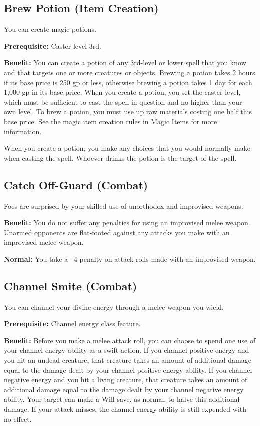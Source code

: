 \subsection{Brew Potion (Item Creation)}

				
You can create magic potions.
				
\textbf{Prerequisite:} Caster level 3rd.
				
\textbf{Benefit:} You can create a potion of any 3rd-level or lower spell that you know and that targets one or more creatures or objects. Brewing a potion takes 2 hours if its base price is 250 gp or less, otherwise brewing a potion takes 1 day for each 1,000 gp in its base price. When you create a potion, you set the caster level, which must be sufficient to cast the spell in question and no higher than your own level. To brew a potion, you must use up raw materials costing one half this base price. See the magic item creation rules in Magic Items for more information.

When you create a potion, you make any choices that you would normally make when casting the spell. Whoever drinks the potion is the target of the spell.
				
\subsection{Catch Off-Guard (Combat)}

				
Foes are surprised by your skilled use of unorthodox and improvised weapons.
				
\textbf{Benefit:} You do not suffer any penalties for using an improvised melee weapon. Unarmed opponents are flat-footed against any attacks you make with an improvised melee weapon.
				
\textbf{Normal:} You take a --4 penalty on attack rolls made with an improvised weapon.
				
\subsection{Channel Smite (Combat)}

				
You can channel your divine energy through a melee weapon you wield.
				
\textbf{Prerequisite:} Channel energy class feature.
				
\textbf{Benefit:} Before you make a melee attack roll, you can choose to spend one use of your channel energy ability as a swift action. If you channel positive energy and you hit an undead creature, that creature takes an amount of additional damage equal to the damage dealt by your channel positive energy ability. If you channel negative energy and you hit a living creature, that creature takes an amount of additional damage equal to the damage dealt by your channel negative energy ability. Your target can make a Will save, as normal, to halve this additional damage. If your attack misses, the channel energy ability is still expended with no effect.
				

